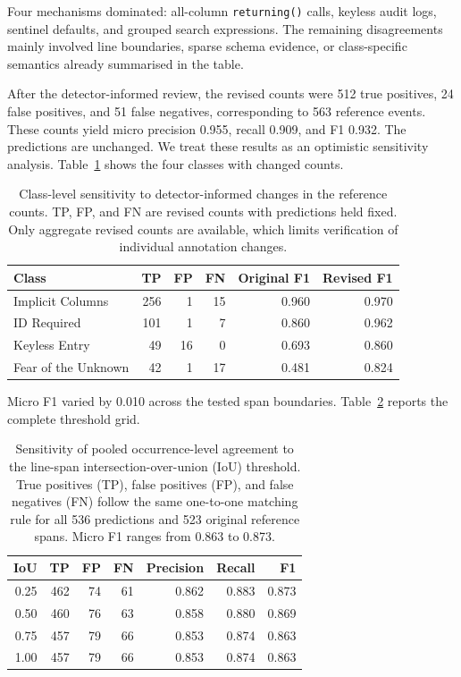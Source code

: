Four mechanisms dominated: all-column \texttt{returning()} calls, keyless audit logs, sentinel defaults, and grouped search expressions. The remaining disagreements mainly involved line boundaries, sparse schema evidence, or class-specific semantics already summarised in the table.

After the detector-informed review, the revised counts were \num{512} true positives, \num{24} false positives, and \num{51} false negatives, corresponding to \num{563} reference events. These counts yield micro precision \num{0.955}, recall \num{0.909}, and F1 \num{0.932}. The predictions are unchanged. We treat these results as an optimistic sensitivity analysis. Table~\ref{tab:revisedClassCounts} shows the four classes with changed counts.

\begin{table}[H]
    \centering
    \small
    \caption{Class-level sensitivity to detector-informed changes in the reference counts. TP, FP, and FN are revised counts with predictions held fixed. Only aggregate revised counts are available, which limits verification of individual annotation changes.}
    \label{tab:revisedClassCounts}
    \begin{tabular}{lrrrrr}
        \hline
        Class & TP & FP & FN & Original F1 & Revised F1 \\
        \hline
        Implicit Columns & 256 & 1 & 15 & 0.960 & 0.970 \\
        ID Required & 101 & 1 & 7 & 0.860 & 0.962 \\
        Keyless Entry & 49 & 16 & 0 & 0.693 & 0.860 \\
        Fear of the Unknown & 42 & 1 & 17 & 0.481 & 0.824 \\
        \hline
    \end{tabular}
\end{table}

Micro F1 varied by \num{0.010} across the tested span boundaries. Table~\ref{tab:iouSensitivity} reports the complete threshold grid.

\begin{table}[H]
    \centering
    \small
    \caption{Sensitivity of pooled occurrence-level agreement to the line-span intersection-over-union (IoU) threshold. True positives (TP), false positives (FP), and false negatives (FN) follow the same one-to-one matching rule for all \num{536} predictions and \num{523} original reference spans. Micro F1 ranges from \num{0.863} to \num{0.873}.}
    \label{tab:iouSensitivity}
    \begin{tabular}{rrrrrrr}
        \hline
        \textbf{IoU} & \textbf{TP} & \textbf{FP} & \textbf{FN} & \textbf{Precision} & \textbf{Recall} & \textbf{F1} \\
        \hline
        0.25 & 462 & 74 & 61 & 0.862 & 0.883 & 0.873 \\
        0.50 & 460 & 76 & 63 & 0.858 & 0.880 & 0.869 \\
        0.75 & 457 & 79 & 66 & 0.853 & 0.874 & 0.863 \\
        1.00 & 457 & 79 & 66 & 0.853 & 0.874 & 0.863 \\
        \hline
    \end{tabular}
\end{table}

